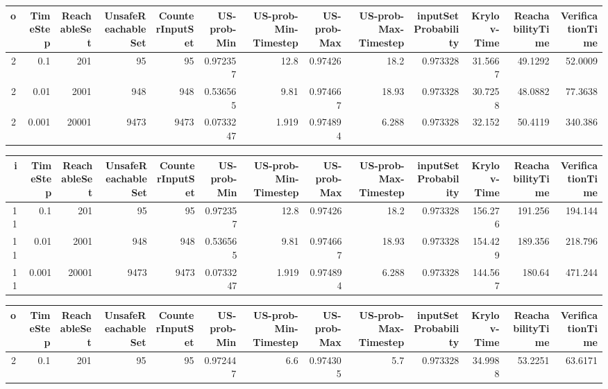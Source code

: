 \begin{tabular}{rrrrrrrrrrrrr}
\hline
   o &   TimeStep &   ReachableSet &   UnsafeReachableSet &   CounterInputSet &   US-prob-Min &   US-prob-Min-Timestep &   US-prob-Max &   US-prob-Max-Timestep &   inputSet Probability &   Krylov-Time &   ReachabilityTime &   VerificationTime \\
\hline
   2 &      0.1   &            201 &                   95 &                95 &     0.972357  &                 12.8   &      0.97426  &                 18.2   &               0.973328 &       31.5667 &            49.1292 &            52.0009 \\
   2 &      0.01  &           2001 &                  948 &               948 &     0.536565  &                  9.81  &      0.974667 &                 18.93  &               0.973328 &       30.7258 &            48.0882 &            77.3638 \\
   2 &      0.001 &          20001 &                 9473 &              9473 &     0.0733247 &                  1.919 &      0.974894 &                  6.288 &               0.973328 &       32.152  &            50.4119 &           340.386  \\
\hline
\end{tabular}
\begin{tabular}{rrrrrrrrrrrrr}
\hline
   i &   TimeStep &   ReachableSet &   UnsafeReachableSet &   CounterInputSet &   US-prob-Min &   US-prob-Min-Timestep &   US-prob-Max &   US-prob-Max-Timestep &   inputSet Probability &   Krylov-Time &   ReachabilityTime &   VerificationTime \\
\hline
  11 &      0.1   &            201 &                   95 &                95 &     0.972357  &                 12.8   &      0.97426  &                 18.2   &               0.973328 &       156.276 &            191.256 &            194.144 \\
  11 &      0.01  &           2001 &                  948 &               948 &     0.536565  &                  9.81  &      0.974667 &                 18.93  &               0.973328 &       154.429 &            189.356 &            218.796 \\
  11 &      0.001 &          20001 &                 9473 &              9473 &     0.0733247 &                  1.919 &      0.974894 &                  6.288 &               0.973328 &       144.567 &            180.64  &            471.244 \\
\hline
\end{tabular}
\begin{tabular}{rrrrrrrrrrrrr}
\hline
   o &   TimeStep &   ReachableSet &   UnsafeReachableSet &   CounterInputSet &   US-prob-Min &   US-prob-Min-Timestep &   US-prob-Max &   US-prob-Max-Timestep &   inputSet Probability &   Krylov-Time &   ReachabilityTime &   VerificationTime \\
\hline
   2 &        0.1 &            201 &                   95 &                95 &      0.972447 &                    6.6 &      0.974305 &                    5.7 &               0.973328 &       34.9988 &            53.2251 &            63.6171 \\
\hline
\end{tabular}
